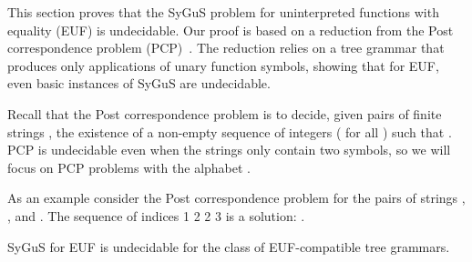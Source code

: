 
This section proves that the SyGuS problem for uninterpreted functions with equality (EUF) is undecidable. Our proof is based on a reduction from the Post correspondence problem (PCP)~\cite{post1946variant}. 
The reduction relies on a tree grammar that produces only applications of unary function symbols, showing that for EUF, even basic instances of SyGuS are undecidable. 



Recall that the Post correspondence problem is to decide, given pairs of finite strings , the existence of a non-empty sequence of integers  ( for all ) such that . 
PCP is undecidable even when the strings only contain two symbols, so we will focus on PCP problems with the alphabet . 

As an example consider the Post correspondence problem for the pairs of strings , , and  . 
The sequence of indices 1 2 2 3 is a solution: . 


\begin{theorem}
\label{thm:euf_und}
SyGuS for EUF is undecidable for the class of EUF-compatible tree grammars. 
\end{theorem}

